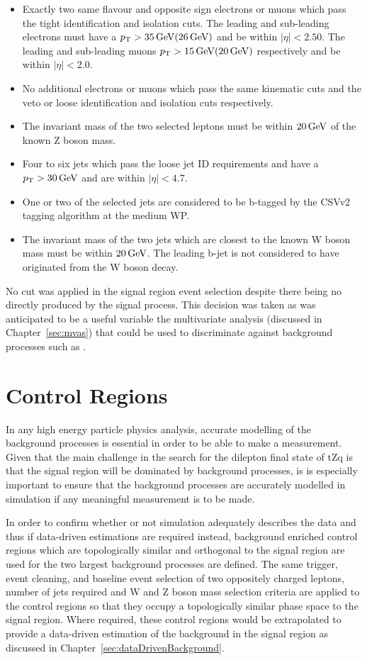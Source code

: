 \begin{itemize}
\item Exactly two same flavour and opposite sign electrons or muons which pass the tight identification and isolation cuts. The leading and sub-leading electrons must have a $p_{\mathrm{T}} > 35\,\text{Ge\hspace{-.08em}V} (26\,\text{Ge\hspace{-.08em}V})$ and be within $|\eta| < 2.50$. The leading and sub-leading muons $p_{\mathrm{T}} > 15\,\text{Ge\hspace{-.08em}V} (20\,\text{Ge\hspace{-.08em}V})$ respectively and be within $|\eta| < 2.0$.
\item No additional electrons or muons which pass the same kinematic cuts and the veto or loose identification and isolation cuts respectively. 
\item The invariant mass of the two selected leptons must be within $20\,\text{Ge\hspace{-.08em}V}$ of the known Z boson mass.
\item Four to six jets which pass the loose jet ID requirements and have a $p_{\mathrm{T}} > 30\,\text{Ge\hspace{-.08em}V}$ and are within $|\eta| < 4.7$.
\item One or two of the selected jets are considered to be b-tagged by the CSVv2 tagging algorithm at the medium WP.
\item The invariant mass of the two jets which are closest to the known W boson mass must be within $20\,\text{Ge\hspace{-.08em}V}$. The leading b-jet is not considered to have originated from the W boson decay.
\end{itemize}

No \MET cut was applied in the signal region event selection despite there being no \MET directly produced by the signal process.
This decision was taken as \MET was anticipated to be a useful variable the multivariate analysis (discussed in Chapter~\ref{sec:mvas}) that could be used to discriminate against background processes such as \ttbar.

\section{Control Regions}\label{sec:controlRegions}
In any high energy particle physics analysis, accurate modelling of the background processes is essential in order to be able to make a measurement.
Given that the main challenge in the search for the dilepton final state of tZq is that the signal region will be dominated by background processes, is is especially important to ensure that the background processes are accurately modelled in simulation if any meaningful measurement is to be made.

In order to confirm whether or not simulation adequately describes the data and thus if data-driven estimations are required instead, background enriched control regions which are topologically similar and orthogonal to the signal region are used for the two largest background processes are defined.
The same trigger, event cleaning, and baseline event selection of two oppositely charged leptons, number of jets required and W and Z boson mass selection criteria are applied to the control regions so that they occupy a topologically similar phase space to the signal region.
Where required, these control regions would be extrapolated to provide a data-driven estimation of the background in the signal region as discussed in Chapter~\ref{sec:dataDrivenBackground}.

